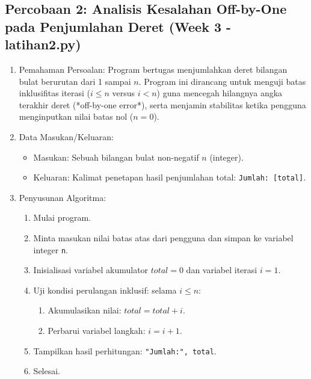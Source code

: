 \documentclass[12pt,a4paper]{article}
\begin{document}
\subsection{Percobaan 2: Analisis Kesalahan Off-by-One pada Penjumlahan Deret (Week 3 - latihan2.py)}
\begin{enumerate}
    \item Pemahaman Persoalan: Program bertugas menjumlahkan deret bilangan bulat berurutan dari 1 sampai $n$. Program ini dirancang untuk menguji batas inklusifitas iterasi ($i \le n$ versus $i < n$) guna mencegah hilangnya angka terakhir deret (*off-by-one error*), serta menjamin stabilitas ketika pengguna menginputkan nilai batas nol ($n = 0$).
    \item Data Masukan/Keluaran:
    \begin{itemize}
        \item Masukan: Sebuah bilangan bulat non-negatif $n$ (integer).
        \item Keluaran: Kalimat penetapan hasil penjumlahan total: \texttt{Jumlah: [total]}.
    \end{itemize}
    \item Penyusunan Algoritma:
    \begin{enumerate}[label=\alph*.]
        \item Mulai program.
        \item Minta masukan nilai batas atas dari pengguna dan simpan ke variabel integer \texttt{n}.
        \item Inisialisasi variabel akumulator $total = 0$ dan variabel iterasi $i = 1$.
        \item Uji kondisi perulangan inklusif: selama $i \le n$:
        \begin{enumerate}[label=\roman*.]
            \item Akumulasikan nilai: $total = total + i$.
            \item Perbarui variabel langkah: $i = i + 1$.
        \end{enumerate}
        \item Tampilkan hasil perhitungan: \texttt{"Jumlah:", total}.
        \item Selesai.
    \end{enumerate}
\end{enumerate}
\end{document}
